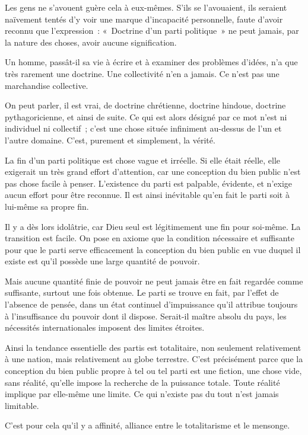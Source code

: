 \documentclass[french,twoside]{book} %
\begin{document}
Les gens ne s’avouent guère cela à eux-mêmes. S’ils se l’avouaient, ils seraient naïvement tentés d’y voir une marque d’incapacité personnelle, faute d’avoir reconnu que l’expression : « Doctrine d’un parti politique » ne peut jamais, par la nature des choses, avoir aucune signification.\par
Un homme, passât-il sa vie à écrire et à examiner des problèmes d’idées, n’a que très rarement une doctrine. Une collectivité n’en a jamais. Ce n’est pas une marchandise collective.\par
On peut parler, il est vrai, de doctrine chrétienne, doctrine hindoue, doctrine pythagoricienne, et ainsi de suite. Ce qui est alors désigné par ce mot n’est ni individuel ni collectif ; c’est une chose située infiniment au-dessus de l’un et l’autre domaine. C’est, purement et simplement, la vérité.\par
La fin d’un parti politique est chose vague et irréelle. Si elle était réelle, elle exigerait un très grand effort d’attention, car une conception du bien public n’est pas chose facile à penser. L’existence du parti est palpable, évidente, et n’exige aucun effort pour être reconnue. Il est ainsi inévitable qu’en fait le parti soit à lui-même sa propre fin.\par
Il y a dès lors idolâtrie, car Dieu seul est légitimement une fin pour soi-même. La transition est facile. On pose en axiome que la condition nécessaire et suffisante pour que le parti serve efficacement la conception du bien public en vue duquel il existe est qu’il possède une large quantité de pouvoir.\par
Mais aucune quantité finie de pouvoir ne peut jamais être en fait regardée comme suffisante, surtout une fois obtenue. Le parti se trouve en fait, par l’effet de l’absence de pensée, dans un état continuel d’impuissance qu’il attribue toujours à l’insuffisance du pouvoir dont il dispose. Serait-il maître absolu du pays, les nécessités internationales imposent des limites étroites.\par
Ainsi la tendance essentielle des partis est totalitaire, non seulement relativement à une nation, mais relativement au globe terrestre. C’est précisément parce que la conception du bien public propre à tel ou tel parti est une fiction, une chose vide, sans réalité, qu’elle impose la recherche de la puissance totale. Toute réalité implique par elle-même une limite. Ce qui n’existe pas du tout n’est jamais limitable.\par
C’est pour cela qu’il y a affinité, alliance entre le totalitarisme et le mensonge.\par
\end{document}
